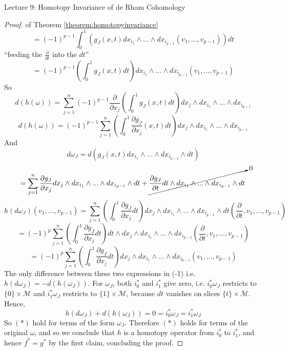 \documentclass[10pt]{article}
\theoremstyle{plain}
\theoremstyle{definition}
\newcommand{\man}{\mathcal{M}}
\newcommand{\allthevs}[2]{v_{#1},...,v_{#2}}
\newcommand{\allthewedge}[3]{{#1}_{#2}\wedge...\wedge{#1}_{#3}}
\newcommand{\dx}{dx}
\newcommand{\deriv}{d}
\newcommand{\dw}{d\omega}
\newcommand{\dt}{\deriv t}
\newcommand{\sumfromto}[2]{\sum\limits_{#1}^{#2}}
\newcommand{\parderiv}[1]{\frac{\partial}{\partial {#1}}}
\begin{document}
\begin{section}{Lecture 9: Homotopy Invariance of de Rham Cohomology}
\begin{proof}{of Theorem \ref{theorem:homotopyinvariance}}
$$= (-1)^{p-1}\int_0^1 \left(g_J(x,t) \allthewedge{\dx}{i_1}{i_{p-1}}\left(\allthevs{1}{p-1}\right)\right)\dt$$
``feeding the $\parderiv{t} $ into the $\dt$''
$$= (-1)^{p-1}\left(\int_0^1 g_J(x,t)\dt\right) \allthewedge{\dx}{i_1}{i_{p-1}}\left(\allthevs{1}{p-1}\right)$$
So $$\deriv(h(\omega)) = \sumfromto{j=1}{n} (-1)^{p-1} \parderiv{x_j} \left(\int_0^1 g_J(x,t)\dt\right)\dx_j \wedge \allthewedge{\dx}{i_1}{i_{p-1}}$$
$$\deriv (h(\omega))= (-1)^{p-1} \sumfromto{j=1}{n} \left(\int_0^1 \frac{\partial g_J}{\partial x_j}(x,t)\dt\right)\dx_j \wedge \allthewedge{\dx}{i_1}{i_{p-1}}$$
And 
$$\dw _J = \deriv( g_J(x,t) \allthewedge{\dx}{i_1}{i_{p-1}}\wedge \dt)$$
$$ = \sumfromto{j=1}{n} \frac{\partial g_J}{\partial x_j} \dx_j \wedge \allthewedge{\dx}{i_1}{i_{p-1}} \wedge \dt + \cancelto{0}{\frac{\partial g_J}{\partial t} \dt \wedge \allthewedge{\dx}{i_1}{i_{p-1}}\wedge \dt}$$
$$h(\dw_J)(\allthevs{1}{p-1}) = \sumfromto{j=1}{n} \left(\int_0^1 \frac{\partial g_J}{\partial x_j} \dt\right)\dx_j \wedge \allthewedge{\dx}{i_1}{i_{p-1}}\wedge\dt\left(\parderiv{t},\allthevs{1}{p-1}\right)$$
$$= (-1)^{p} \sumfromto{j=1}{n} \left(\int_0^1 \frac{\partial g_J}{\partial x_j} \dt\right)\dt \wedge\dx_j \wedge \allthewedge{\dx}{i_1}{i_{p-1}}\left(\parderiv{t},\allthevs{1}{p-1}\right)$$
$$= (-1)^{p} \sumfromto{j=1}{n} \left(\int_0^1 \frac{\partial g_J}{\partial x_j} \dt\right) \dx_j \wedge \allthewedge{\dx}{i_1}{i_{p-1}}\left(\allthevs{1}{p-1}\right)$$
The only difference between these two expressions in (-1) i.e. $h(\dw_J) = -\deriv(h(\omega_J))$. For $\omega_J$, both $i_0^*$ and $i_1^*$ give zero, i.e. $i^*_0\omega_J$ restricts to $\{0\}\times\man$ and $i^*_1\omega_J$ restricts to $\{1\}\times\man$, because $\dt$ vanishes on slices $\{t\}\times \man$. Hence,
$$h(\dw_J) + \deriv (h(\omega_J)) = 0 = i_0^*\omega_J = i_1^*\omega_J$$
So $(*)$ hold for terms of the form $\omega _J$. Therefore $(*)$ holds for terms of the original $\omega$, and so we conclude that $h$ is a homotopy operator from $i_0^*$ to $i_1^*$, and hence $f^*=g^*$ by the first claim, concluding the proof.
\end{proof}
\end{section}
\end{document}
